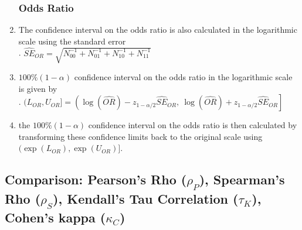 \begin{enumerate}
\subsubsection{Odds Ratio}

    \item The confidence interval on the odds ratio is also calculated in the logarithmic scale using the standard error
    \hfill \cite{statistics/book/Statistics-for-Data-Scientists/Maurits-Kaptein}
    \\
    .\hfill
    $ \hat{S E}_{O R} = \sqrt{N^{-1}_{00} + N^{-1}_{01} + N^{-1}_{10} + N^{-1}_{11} } $
    \hfill \cite{statistics/book/Statistics-for-Data-Scientists/Maurits-Kaptein}

    \item $100\%(1 - \alpha)$ confidence interval on the odds ratio in the logarithmic scale is given by
    \hfill \cite{statistics/book/Statistics-for-Data-Scientists/Maurits-Kaptein}
    \\
    .\hfill
    $
        (L_{O R} , U_{O R} ] =
        \left(
            \log( \hat{OR}) - z_{1-\alpha/2} \hat{SE}_{OR} ,
            \ \log( \hat{OR}) + z_{1-\alpha/2} \hat{SE}_{OR}
        \right]
    $
    \hfill \cite{statistics/book/Statistics-for-Data-Scientists/Maurits-Kaptein}

    \item  the $100\%(1 - \alpha)$ confidence interval on the odds ratio is then calculated by transforming these confidence limits back to the original scale using $(\exp(L_{O R} ), \exp (U_{O R} )]$.
    \hfill \cite{statistics/book/Statistics-for-Data-Scientists/Maurits-Kaptein}
\end{enumerate}

















\subsection{Comparison: Pearson’s Rho ($\rho_P$), Spearman’s Rho ($\rho_S$), Kendall’s Tau Correlation ($\tau_K$), Cohen’s kappa ($\kappa_C$)}

